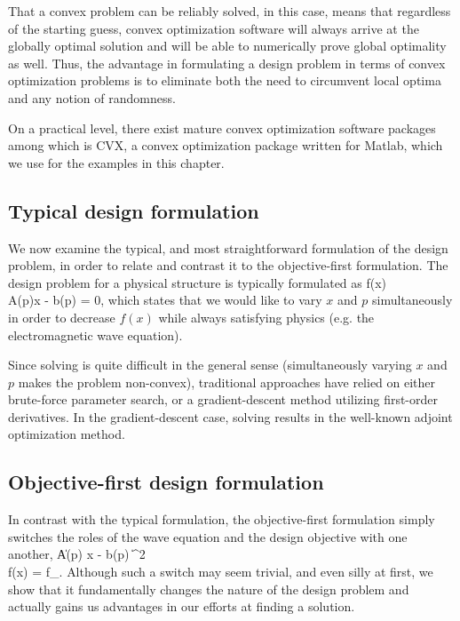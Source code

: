 That a convex problem can be reliably solved, in this case, 
    means that regardless of the starting guess,
    convex optimization software will 
    always arrive at the globally optimal solution
    and will be able to numerically prove global optimality as well.
Thus, the advantage in formulating a design problem 
    in terms of convex optimization problems
    is to eliminate both the need to circumvent local optima and 
    any notion of randomness.

On a practical level, there exist mature convex optimization software packages
    among which is CVX, a convex optimization package written for Matlab\cite{cvx}, 
    which we use for the examples in this chapter.


\subsection{Typical design formulation}
We now examine the typical, and most straightforward formulation
    of the design problem,
    in order to relate and contrast it to the objective-first formulation.
The design problem for a physical structure is typically formulated as
\BA {} f(x) \label{eq:typform} \\
    \subto A(p)x - b(p) = 0, \notag \EA
    which states that we would like to vary $x$ and $p$ simultaneously
    in order to decrease $f(x)$
    while always satisfying physics (e.g. the electromagnetic wave equation).

Since solving  is quite difficult in the general sense
    (simultaneously varying $x$ and $p$ makes the problem non-convex),
    traditional approaches have relied on either brute-force parameter search,
    or a gradient-descent method utilizing first-order derivatives.
In the gradient-descent case, solving  results in the
    well-known adjoint optimization method\cite{miller}. 

\subsection{Objective-first design formulation}
In contrast with the typical formulation, the objective-first formulation 
    simply switches the roles of 
    the wave equation and the design objective with one another,
\BA {} \| A(p) x - b(p) \|^2 \label{eq:ob1:1} \\
    \subto f(x) = f_. \label{eq:ob1:2} \EA
Although such a switch may seem trivial,
    and even silly at first,
    we show that it fundamentally changes the nature of the design problem
    and actually gains us advantages in our efforts at finding a solution.

